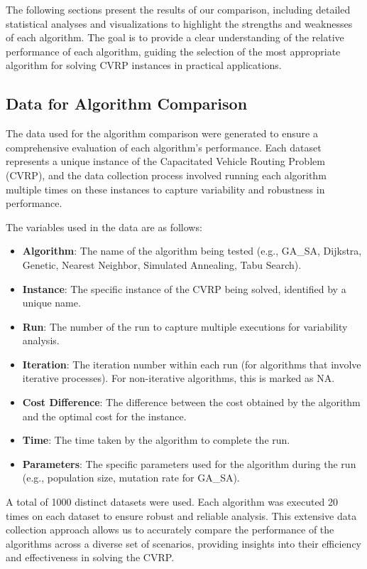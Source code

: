 \documentclass{article}
\begin{document}
    The following sections present the results of our comparison, including detailed statistical analyses and visualizations to highlight the strengths and weaknesses of each algorithm. The goal is to provide a clear understanding of the relative performance of each algorithm, guiding the selection of the most appropriate algorithm for solving CVRP instances in practical applications.

    \subsection{Data for Algorithm Comparison}

    The data used for the algorithm comparison were generated to ensure a comprehensive evaluation of each algorithm's performance. Each dataset represents a unique instance of the Capacitated Vehicle Routing Problem (CVRP), and the data collection process involved running each algorithm multiple times on these instances to capture variability and robustness in performance.

    The variables used in the data are as follows:

    \begin{itemize}
        \item \textbf{Algorithm}: The name of the algorithm being tested (e.g., GA\_SA, Dijkstra, Genetic, Nearest Neighbor, Simulated Annealing, Tabu Search).
        \item \textbf{Instance}: The specific instance of the CVRP being solved, identified by a unique name.
        \item \textbf{Run}: The number of the run to capture multiple executions for variability analysis.
        \item \textbf{Iteration}: The iteration number within each run (for algorithms that involve iterative processes). For non-iterative algorithms, this is marked as NA.
        \item \textbf{Cost Difference}: The difference between the cost obtained by the algorithm and the optimal cost for the instance.
        \item \textbf{Time}: The time taken by the algorithm to complete the run.
        \item \textbf{Parameters}: The specific parameters used for the algorithm during the run (e.g., population size, mutation rate for GA\_SA).
    \end{itemize}

    A total of 1000 distinct datasets were used.
    Each algorithm was executed 20 times on each dataset to ensure robust and reliable analysis. This extensive data collection approach allows us to accurately compare the performance of the algorithms across a diverse set of scenarios, providing insights into their efficiency and effectiveness in solving the CVRP.
\end{document}
